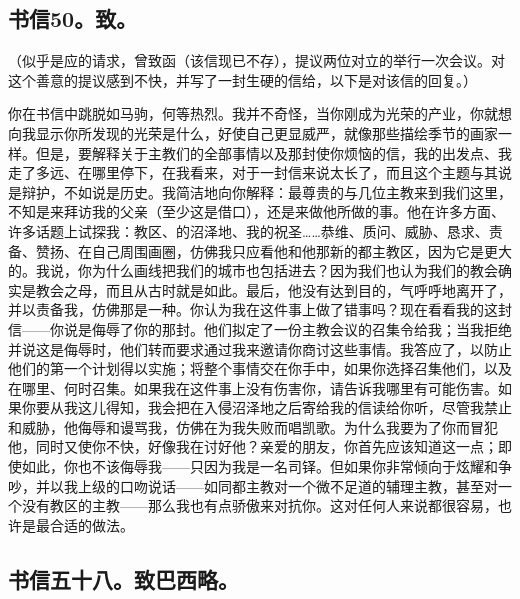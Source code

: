 
\subsection{书信50。致。}

（似乎是应的请求，曾致函（该信现已不存），提议两位对立的举行一次会议。对这个善意的提议感到不快，并写了一封生硬的信给，以下是对该信的回复。）\par

你在书信中跳脱如马驹，何等热烈。我并不奇怪，当你刚成为光荣的产业，你就想向我显示你所发现的光荣是什么，好使自己更显威严，就像那些描绘季节的画家一样。但是，要解释关于主教们的全部事情以及那封使你烦恼的信，我的出发点、我走了多远、在哪里停下，在我看来，对于一封信来说太长了，而且这个主题与其说是辩护，不如说是历史。我简洁地向你解释：最尊贵的与几位主教来到我们这里，不知是来拜访我的父亲（至少这是借口），还是来做他所做的事。他在许多方面、许多话题上试探我：教区、的沼泽地、我的祝圣……恭维、质问、威胁、恳求、责备、赞扬、在自己周围画圈，仿佛我只应看他和他那新的都主教区，因为它是更大的。我说，你为什么画线把我们的城市也包括进去？因为我们也认为我们的教会确实是教会之母，而且从古时就是如此。最后，他没有达到目的，气呼呼地离开了，并以责备我，仿佛那是一种。你认为我在这件事上做了错事吗？现在看看我的这封信——你说是侮辱了你的那封。他们拟定了一份主教会议的召集令给我；当我拒绝并说这是侮辱时，他们转而要求通过我来邀请你商讨这些事情。我答应了，以防止他们的第一个计划得以实施；将整个事情交在你手中，如果你选择召集他们，以及在哪里、何时召集。如果我在这件事上没有伤害你，请告诉我哪里有可能伤害。如果你要从我这儿得知，我会把在入侵沼泽地之后寄给我的信读给你听，尽管我禁止和威胁，他侮辱和谩骂我，仿佛在为我失败而唱凯歌。为什么我要为了你而冒犯他，同时又使你不快，好像我在讨好他？亲爱的朋友，你首先应该知道这一点；即使如此，你也不该侮辱我——只因为我是一名司铎。但如果你非常倾向于炫耀和争吵，并以我上级的口吻说话——如同都主教对一个微不足道的辅理主教，甚至对一个没有教区的主教——那么我也有点骄傲来对抗你。这对任何人来说都很容易，也许是最合适的做法。\par


\subsection{书信五十八。致巴西略。}

